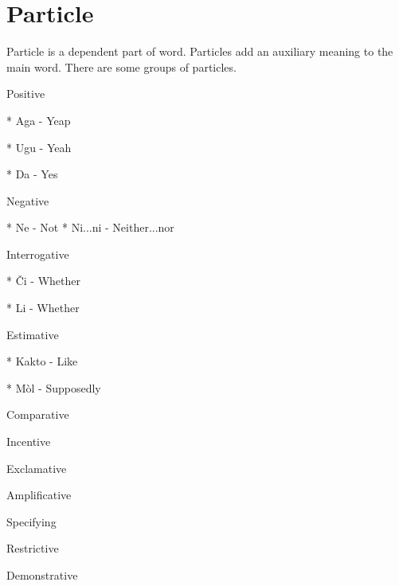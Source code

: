 \section{Particle}

Particle is a dependent part of word. Particles add an auxiliary meaning to the main word. There are some groups of particles.

Positive

* Aga - Yeap

* Ugu - Yeah

* Da - Yes

Negative

* Ne - Not
* Ni...ni - Neither...nor

Interrogative

* Či - Whether

* Li - Whether

Estimative

* Kakto - Like

* Mòl - Supposedly

Comparative

Incentive

Exclamative

Amplificative


Specifying

Restrictive

Demonstrative


